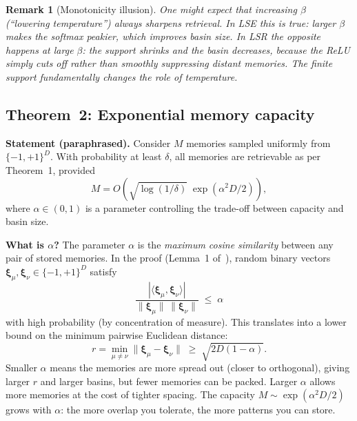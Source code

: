 \documentclass[11pt]{article}
\newtheorem{remark}{Remark}
\begin{document}
\begin{remark}[Monotonicity illusion]
One might expect that increasing $\beta$ (``lowering temperature'') always
sharpens retrieval.  In LSE this is true: larger $\beta$ makes the softmax
peakier, which improves basin size.  In LSR the opposite happens at large
$\beta$: the support shrinks and the basin \emph{decreases}, because the
ReLU simply cuts off rather than smoothly suppressing distant memories.
The finite support fundamentally changes the role of temperature.
\end{remark}

\subsection{Theorem~2: Exponential memory capacity}

\textbf{Statement (paraphrased).}
Consider $M$ memories sampled uniformly from $\{-1,+1\}^D$.  With probability
at least $\delta$, all memories are retrievable as per Theorem~1, provided
\begin{equation}
  M = O\!\left(\sqrt{\log(1/\delta)}\;\exp(\alpha^2 D/2)\right),
\end{equation}
where $\alpha \in (0,1)$ is a parameter controlling the trade-off between
capacity and basin size.

\textbf{What is $\alpha$?}
The parameter $\alpha$ is the \emph{maximum cosine similarity} between any
pair of stored memories.  In the proof (Lemma~1 of~\cite{Hoover2025}),
random binary vectors $\boldsymbol{\xi}_\mu, \boldsymbol{\xi}_\nu \in
\{-1,+1\}^D$ satisfy
\begin{equation}
  \frac{|\langle \boldsymbol{\xi}_\mu, \boldsymbol{\xi}_\nu\rangle|}
       {\|\boldsymbol{\xi}_\mu\|\,\|\boldsymbol{\xi}_\nu\|}
  \;\leq\; \alpha
\end{equation}
with high probability (by concentration of measure).  This translates into a
lower bound on the minimum pairwise Euclidean distance:
\begin{equation}\label{eq:r-bound}
  r = \min_{\mu\neq\nu}\|\boldsymbol{\xi}_\mu - \boldsymbol{\xi}_\nu\|
  \;\geq\; \sqrt{2D(1-\alpha)}.
\end{equation}
Smaller $\alpha$ means the memories are more spread out (closer to
orthogonal), giving larger $r$ and larger basins, but fewer memories can be
packed.  Larger $\alpha$ allows more memories at the cost of tighter spacing.
The capacity $M \sim \exp(\alpha^2 D/2)$ grows with $\alpha$: the more
overlap you tolerate, the more patterns you can store.
\end{document}
